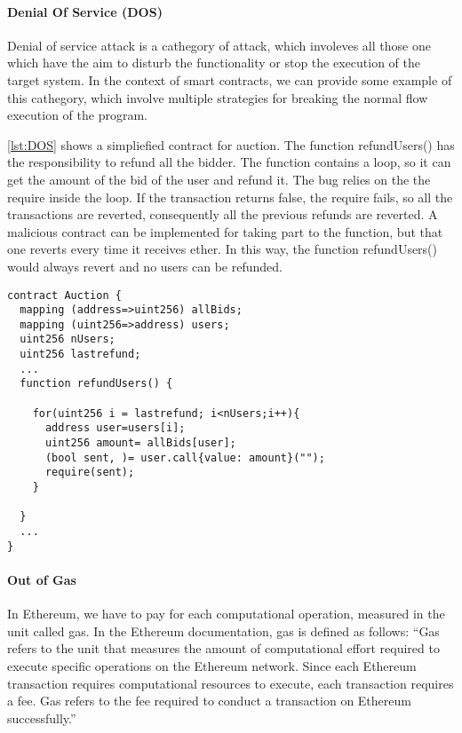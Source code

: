\documentclass[a4paper,sigconf, language=french,
language=german, language=spanish, language=english]{acmart}
\begin{document}
\paragraph{Denial Of Service (DOS)} Denial of service attack is a cathegory of attack, which involeves all those one which have the aim to 
disturb the functionality or stop the execution of the target system. In the context of smart contracts, we can provide some example of this cathegory, 
which involve multiple strategies for breaking the normal flow execution of the program.

\autoref{lst:DOS} shows a simpliefied contract for auction. The function refundUsers() has the responsibility to refund all the bidder. 
The function contains a loop, so it can get the amount of the bid of the user and refund it. The bug relies on the the require inside the loop. If the transaction returns false, 
the require fails, so all the transactions are reverted, consequently all the previous refunds are reverted. A malicious contract can be implemented for taking part to the function, but 
that one reverts every time it receives ether. In this way, the function refundUsers() would always revert and no users can be refunded.

\begin{lstlisting}[language=Solidity,caption={Denial of Service/Out of Gas},label={lst:DOS}]
contract Auction {
  mapping (address=>uint256) allBids;
  mapping (uint256=>address) users;
  uint256 nUsers;
  uint256 lastrefund;
  ... 
  function refundUsers() {
    
    for(uint256 i = lastrefund; i<nUsers;i++){
      address user=users[i];
      uint256 amount= allBids[user];
      (bool sent, )= user.call{value: amount}("");
      require(sent);
    }

  }
  ... 
}
\end{lstlisting}


\paragraph{Out of Gas} In Ethereum, we have to pay for each computational operation, measured in the unit called gas. 
In the Ethereum documentation, gas is defined as follows: “Gas refers to the unit that measures the amount of computational effort required to execute specific operations on the Ethereum network. 
Since each Ethereum transaction requires computational resources to execute, each transaction requires a fee. 
Gas refers to the fee required to conduct a transaction on Ethereum successfully.” 
\end{document}
